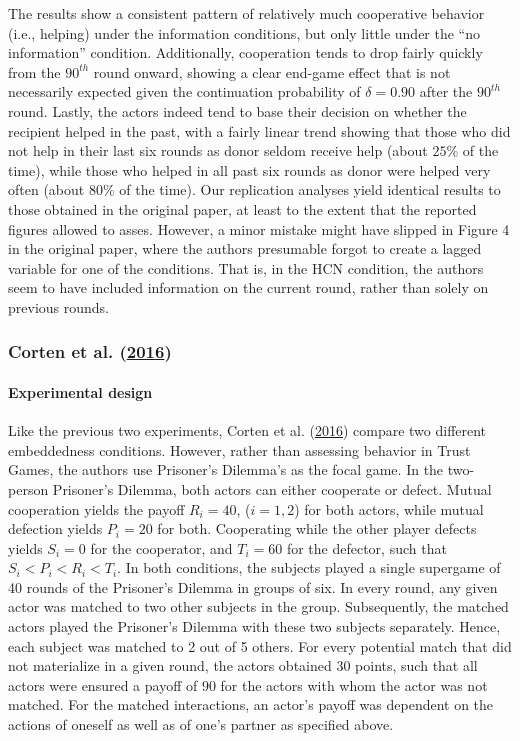 \documentclass[
  11pt,
]{article}
\begin{document}
The results show a consistent pattern of relatively much cooperative behavior (i.e., helping) under the information conditions, but only little under the ``no information'' condition.
Additionally, cooperation tends to drop fairly quickly from the \(90^{th}\) round onward, showing a clear end-game effect that is not necessarily expected given the continuation probability of \(\delta = 0.90\) after the \(90^{th}\) round.
Lastly, the actors indeed tend to base their decision on whether the recipient helped in the past, with a fairly linear trend showing that those who did not help in their last six rounds as donor seldom receive help (about \(25\%\) of the time), while those who helped in all past six rounds as donor were helped very often (about \(80\%\) of the time).
Our replication analyses yield identical results to those obtained in the original paper, at least to the extent that the reported figures allowed to asses.
However, a minor mistake might have slipped in Figure 4 in the original paper, where the authors presumable forgot to create a lagged variable for one of the conditions.
That is, in the HCN condition, the authors seem to have included information on the current round, rather than solely on previous rounds.

\hypertarget{corten_etal_reputation_2016}{%
\subsubsection{\texorpdfstring{Corten et al. (\protect\hyperlink{ref-corten_etal_reputation_2016}{2016})}{Corten et al. (2016)}}\label{corten_etal_reputation_2016}}

\hypertarget{experimental-design-3}{%
\paragraph{Experimental design}\label{experimental-design-3}}

Like the previous two experiments, Corten et al. (\protect\hyperlink{ref-corten_etal_reputation_2016}{2016}) compare two different embeddedness conditions. However, rather than assessing behavior in Trust Games, the authors use Prisoner's Dilemma's as the focal game. In the two-person Prisoner's Dilemma, both actors can either cooperate or defect. Mutual cooperation yields the payoff \(R_i = 40\), (\(i = 1,2\)) for both actors, while mutual defection yields \(P_i = 20\) for both. Cooperating while the other player defects yields \(S_i = 0\) for the cooperator, and \(T_i = 60\) for the defector, such that \(S_i < P_i < R_i < T_i\). In both conditions, the subjects played a single supergame of 40 rounds of the Prisoner's Dilemma in groups of six. In every round, any given actor was matched to two other subjects in the group. Subsequently, the matched actors played the Prisoner's Dilemma with these two subjects separately. Hence, each subject was matched to 2 out of 5 others. For every potential match that did not materialize in a given round, the actors obtained 30 points, such that all actors were ensured a payoff of \(90\) for the actors with whom the actor was not matched. For the matched interactions, an actor's payoff was dependent on the actions of oneself as well as of one's partner as specified above.
\end{document}
